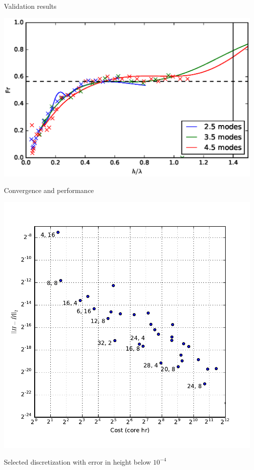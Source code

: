 \documentclass[12pt]{beamer}
\begin{document}
\begin{frame}{Validation results}
\begin{center}
\includegraphics[height=0.90\textheight]{graphics/Fr.eps}
\end{center}
\end{frame}

\begin{frame}{Convergence and performance}
\begin{center}
\vspace{-10pt}
\includegraphics[height=0.89\textheight]{graphics/mira_H.pdf}
\end{center}
\vspace{-20pt}
Selected discretization with error in height below $10^{-4}$
\end{frame}
\end{document}
